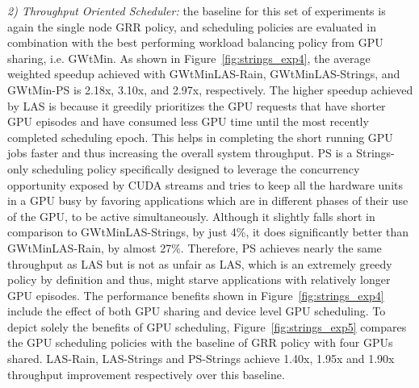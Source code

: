 \textit{2) Throughput Oriented Scheduler: } the baseline for this set of experiments is again the single node GRR policy, and scheduling policies are evaluated in combination with the best performing workload balancing policy from GPU sharing, i.e. GWtMin. As shown in Figure~\ref{fig:strings_exp4}, the average weighted speedup achieved with GWtMinLAS-Rain, GWtMinLAS-Strings, and GWtMin-PS is 2.18x, 3.10x, and 2.97x, respectively. The higher speedup achieved by LAS is because it greedily prioritizes the GPU requests that have shorter GPU episodes and have consumed less GPU time until the most recently completed scheduling epoch. This helps in completing the short running GPU jobs faster and thus increasing the overall system throughput. PS is a Strings-only scheduling policy specifically designed to leverage the concurrency opportunity exposed by CUDA streams and tries to keep all the hardware units in a GPU busy by favoring applications which are in different phases of their use of the GPU, to be active simultaneously. Although it slightly falls short in comparison to GWtMinLAS-Strings, by just 4\%, it does significantly better than   GWtMinLAS-Rain,   by   almost   27\%.   Therefore,   PS achieves  nearly  the  same  throughput  as  LAS  but  is  not  as unfair as LAS, which is an extremely greedy policy by definition and thus, might starve applications with relatively longer GPU episodes. The performance benefits shown in Figure~\ref{fig:strings_exp4} include the effect of both GPU sharing and device level GPU scheduling. To depict solely the benefits of GPU scheduling, Figure~\ref{fig:strings_exp5} compares the GPU scheduling policies with the baseline of GRR policy with four GPUs shared.  LAS-Rain, LAS-Strings and PS-Strings achieve 1.40x, 1.95x and 1.90x throughput improvement respectively over this baseline.

